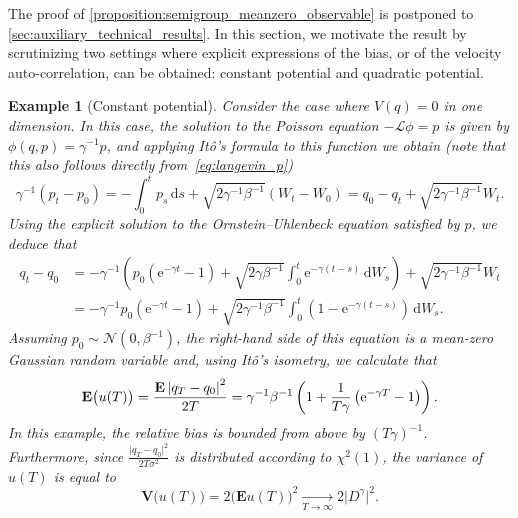 \documentclass[11pt,a4paper]{article}
\newcommand{\e}{\mathrm{e}}
\newcommand{\expect}[0]{\mathbf{E}}
\newcommand{\var}[0]{\mathbf{V}}
\renewcommand{\d}{\mathrm d}
\theoremstyle{plain}
\newtheorem{example}{Example}[section]
\numberwithin{equation}{section}
\begin{document}
The proof of \cref{proposition:semigroup_meanzero_observable} is postponed to \cref{sec:auxiliary_technical_results}.
In this section,
we motivate the result by scrutinizing two settings where
explicit expressions of the bias, or of the velocity auto-correlation,
can be obtained:
constant potential and quadratic potential.
\begin{example}
    [Constant potential]
    \label{example:constant}
    Consider the case where $V(q) = 0$ in one dimension.
    In this case, the solution to the Poisson equation $- \mathcal L \phi = p$ is given by $\phi(q, p) = \gamma^{-1} p$,
    and applying Itô's formula to this function we obtain
    (note that this also follows directly from~\eqref{eq:langevin_p})
    \[
        \gamma^{-1}(p_t - p_0) = - \int_{0}^{t} p_s \, \d s + \sqrt{2 \gamma^{-1} \beta^{-1}} (W_t - W_0)
        = q_0 - q_t + \sqrt{2 \gamma^{-1} \beta^{-1}} W_t.
    \]
    Using the explicit solution to the Ornstein--Uhlenbeck equation satisfied by $p$,
    we deduce that
    \begin{align*}
        q_t - q_0
        &= - \gamma^{-1} \left( p_0 \left(\e^{-\gamma t} - 1\right) + \sqrt{2 \gamma \beta^{-1}}\int_{0}^{t} \e^{-\gamma (t - s)} \, \d W_s \right)
        + \sqrt{2 \gamma^{-1} \beta^{-1}} W_t \\
        &=  - \gamma^{-1} p_0 \left(\e^{-\gamma t} - 1\right) + \sqrt{2 \gamma^{-1} \beta^{-1}}\int_{0}^{t} \left(1 - \e^{-\gamma (t - s)}\right) \, \d W_s.
    \end{align*}
    Assuming $p_0 \sim \mathcal N(0, \beta^{-1})$,
    the right-hand side of this equation is a mean-zero Gaussian random variable and,
    using It\^o's isometry, we calculate that
    \[
        \expect \bigl( u(T) \bigr) = \frac{\expect \abs{q_T - q_0}^2}{2T} = \gamma^{-1} \beta^{-1} \left( 1 + \frac{1}{T \gamma} \left(\e^{-\gamma T} - 1\right) \right).
    \]
    In this example, the relative bias is bounded from above by $(T \gamma)^{-1}$.
    Furthermore,
    since $\frac{\lvert q_T- q_0 \rvert^2}{2T\sigma^2}$ is distributed according to $\chi^2(1)$,
    the variance of $u(T)$ is equal to
    \[
        \var \bigl(u(T)\bigr) = 2  \bigl(\expect u(T)\bigr)^2
        \xrightarrow[T \to \infty]{} 2 \lvert D^{\gamma} \rvert^2.
    \]
\end{example}
\end{document}
